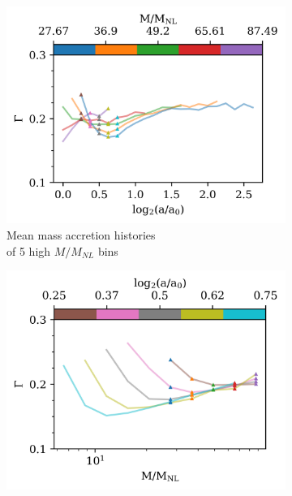 \begin{figure}
\centering
\begin{subfigure}{.49\textwidth}
\centering
\includegraphics[width=\textwidth]{Ch3_Self_Sim/Paper_Plots_gtr20/M200c_gtr20_ROCKSTAR_n15_z_mean_mah_vs_a_early_time_investigation_050824.png}
\caption{Mean mass accretion histories\\ of 5 high $M/M_{NL}$ bins}
\end{subfigure}
\hfil
\begin{subfigure}{.49\textwidth}
\centering
\includegraphics[width=\textwidth]{Ch3_Self_Sim/Paper_Plots_gtr20/M200c_gtr20_ROCKSTAR_n15_z_mean_mah_vs_M_M_NL_early_time_investigation_050824.png}

\end{subfigure}
\end{figure}
